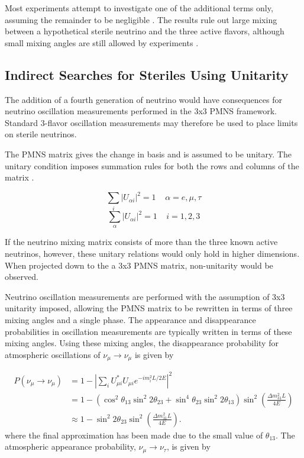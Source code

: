 Most experiments attempt to investigate one of the additional terms only, assuming the remainder to be negligible \cite{SuperK-Steriles2015, IceCubeSterile-Andrii, IceCubeSterile-IC86-1}. 
The results rule out large mixing between a hypothetical sterile neutrino and the three active flavors, although small mixing angles are still allowed by experiments \cite{GlobalSteriles-2017, Review-LightSterile}.

\subsection{Indirect Searches for Steriles Using Unitarity}
\label{subsec:steriles_unitarity}
The addition of a fourth generation of neutrino would have consequences for neutrino oscillation measurements performed in the 3x3 PMNS framework.
Standard 3-flavor oscillation measurements may therefore be used to place limits on sterile neutrinos.

The PMNS matrix gives the change in basis and is assumed to be unitary.
The unitary condition imposes summation rules for both the rows and columns of the matrix \cite{Parke-Unitarity}.

\begin{equation}
\sum_i \left| U_{\alpha i} \right|^2 = 1 \;\;\;\; \alpha=e, \mu, \tau
\label{eqn:unitarity_condition_flavor}
\end{equation}
\begin{equation}
\sum_\alpha \left| U_{\alpha i} \right|^2 = 1 \;\;\;\; i=1,2,3
\label{eqn:unitarity_condition_mass}
\end{equation}

If the neutrino mixing matrix consists of more than the three known active neutrinos, however, these unitary relations would only hold in higher dimensions.
When projected down to the a 3x3 PMNS matrix, non-unitarity would be observed.

Neutrino oscillation measurements are performed with the assumption of 3x3 unitarity imposed, allowing the PMNS matrix to be rewritten in terms of three mixing angles and a single phase.
The appearance and disappearance probabilities in oscillation measurements are typically written in terms of these mixing angles.
Using these mixing angles, the disappearance probability for atmospheric oscillations of $\nu_\mu \rightarrow \nu_\mu$ is given by

\begin{equation}
\begin{aligned}
P\left(\nu_\mu\rightarrow\nu_\mu\right) &{}=  1 -  \left| \sum_i U^*_{\mu i} U_{\mu i} e^{-i m_i^2 L/2E} \right|^2 \\
 						&{}= 1 - \left( \cos^2 \theta_{13} \sin^2 2 \theta_{23} + \sin^4 \theta_{23} \sin^2 2 \theta_{13} \right) \sin^2 \left( \frac{\Delta m^2_{31} L}{4 E} \right) \\
 						&{}\approx 1 - \sin^2 2 \theta_{23} \sin^2 \left(\frac{\Delta m^2_{31} L}{4 E} \right).
\end{aligned}
\label{eqn:mu_disappearance_probability}
\end{equation}
%
where the final approximation has been made due to the small value of $\theta_{13}$.
The atmospheric appearance probability, $\nu_\mu \rightarrow \nu_\tau$, is given by

